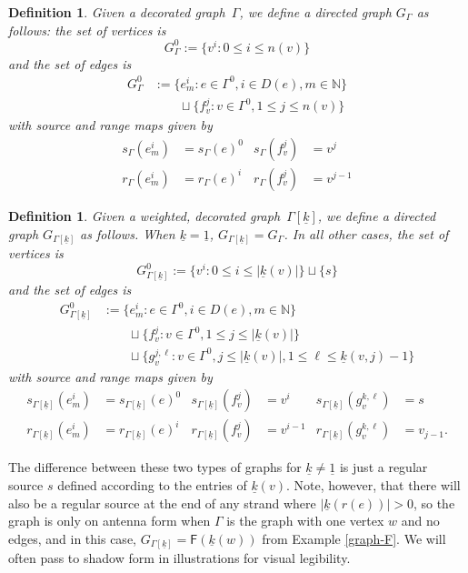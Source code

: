 \documentclass[12pt]{amsbook}%
\theoremstyle{defin}
\newtheorem{defin}[theor]{Definition}
\theoremstyle{remark}
\numberwithin{equation}{chapter}
\numberwithin{theor}{section}
\newcommand{\kk}{\underline{k}}
\newcommand{\GF}{{\mathsf F}}
\newcommand{\WDG}{weighted, decorated graph}
\newcommand{\DG}{decorated graph}
\begin{document}
\begin{defin}
Given a \DG\ $\Gamma$, we define a directed graph $G_{\Gamma}$ as follows:  the set of vertices is 
\[
G_{\Gamma}^0 := \{ v^i : 0 \leq i \leq n(v) \}%
\]
and the set of edges is 
\begin{align*}
G_{\Gamma}^0 &:= \{ e^i_m : e \in \Gamma^0, i \in D(e), m \in \mathbb{N} \} \\
	&\qquad \sqcup \{ f^j_v : v \in \Gamma^0 ,  1 \leq j \leq n(v) \} \end{align*}
with source and range maps given by 
\begin{align*}
s_{ \Gamma } (e^i_m)&= s_\Gamma(e)^0 & s_{ \Gamma } (f^j_v) &= v^j \\
r_{ \Gamma } (e^i_m)&= r_\Gamma(e)^i & r_{ \Gamma } (f^j_v) &= v^{j-1} 
\end{align*}

\end{defin}


\begin{defin}
Given a \WDG\ $\Gamma[\underline k]$, we define a directed graph $G_{\Gamma[\underline{k}]}$ as follows. When $\underline{k}= \underline 1$,  $G_{\Gamma[\underline{k}]}=G_\Gamma$. In all other cases, the set of vertices is 
\[
G_{\Gamma[\underline{k}]}^0 := \{ v^i : 0 \leq i \leq |\underline{k}(v)| \} \sqcup \{ s\}
\]
and the set of edges is 
\begin{align*}
G_{\Gamma[\underline{k}]}^0 &:= \{ e^i_m : e \in \Gamma^0, i \in D(e), m \in \mathbb{N} \} \\
	&\qquad \sqcup \{ f^j_v : v \in \Gamma^0 , 1 \leq j \leq |\underline{k}(v)| \} \\
	&\qquad \sqcup \{ g^{j,\ell}_v : v \in \Gamma^0 , j\leq |\kk(v)|, 1\leq \ell\leq \kk(v,j)-1 \}
\end{align*}
with source and range maps given by 
\begin{align*}
s_{ \Gamma[\underline{k}] } (e^i_m)&= s_{ \Gamma[\underline{k}] }(e)^0 & s_{ \Gamma[\underline{k}] } (f^j_v) &= v^i & s_{ \Gamma[\underline{k}] } (g^{k,\ell}_v) &= s \\
r_{ \Gamma[\underline{k}] } (e^i_m)&= r_{ \Gamma[\underline{k}] }(e)^i & r_{ \Gamma[\underline{k}] } (f^j_v) &= v^{i-1} & r_{ \Gamma[\underline{k}] } (g^{k,\ell}_v) &= v_{j-1}. 
\end{align*}
\end{defin}

The difference between these two types of graphs for $\underline k\not=\underline 1$ is just a regular source $s$ defined according to the entries of $\kk(v)$. Note, however, that there will also be a regular  source at the end of any strand where $|\kk(r(e))|>0$, so the graph is only on  antenna form when $\Gamma$ is the graph with one vertex $w$ and no edges,  and in this case, $G_{\Gamma[\kk]}=\GF(\kk(w))$ from Example \ref{graph-F}.  We will often pass to shadow form in illustrations for visual legibility.
\end{document}
